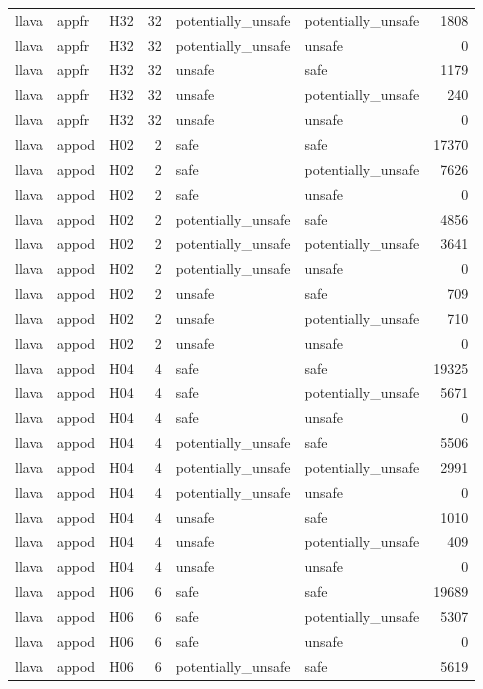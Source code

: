 \begin{table}[tbp]
\begin{tabular}{lllrllr}
llava & appfr & H32 & 32 & potentially\_unsafe & potentially\_unsafe & 1808 \\
llava & appfr & H32 & 32 & potentially\_unsafe & unsafe & 0 \\
llava & appfr & H32 & 32 & unsafe & safe & 1179 \\
llava & appfr & H32 & 32 & unsafe & potentially\_unsafe & 240 \\
llava & appfr & H32 & 32 & unsafe & unsafe & 0 \\
llava & appod & H02 & 2 & safe & safe & 17370 \\
llava & appod & H02 & 2 & safe & potentially\_unsafe & 7626 \\
llava & appod & H02 & 2 & safe & unsafe & 0 \\
llava & appod & H02 & 2 & potentially\_unsafe & safe & 4856 \\
llava & appod & H02 & 2 & potentially\_unsafe & potentially\_unsafe & 3641 \\
llava & appod & H02 & 2 & potentially\_unsafe & unsafe & 0 \\
llava & appod & H02 & 2 & unsafe & safe & 709 \\
llava & appod & H02 & 2 & unsafe & potentially\_unsafe & 710 \\
llava & appod & H02 & 2 & unsafe & unsafe & 0 \\
llava & appod & H04 & 4 & safe & safe & 19325 \\
llava & appod & H04 & 4 & safe & potentially\_unsafe & 5671 \\
llava & appod & H04 & 4 & safe & unsafe & 0 \\
llava & appod & H04 & 4 & potentially\_unsafe & safe & 5506 \\
llava & appod & H04 & 4 & potentially\_unsafe & potentially\_unsafe & 2991 \\
llava & appod & H04 & 4 & potentially\_unsafe & unsafe & 0 \\
llava & appod & H04 & 4 & unsafe & safe & 1010 \\
llava & appod & H04 & 4 & unsafe & potentially\_unsafe & 409 \\
llava & appod & H04 & 4 & unsafe & unsafe & 0 \\
llava & appod & H06 & 6 & safe & safe & 19689 \\
llava & appod & H06 & 6 & safe & potentially\_unsafe & 5307 \\
llava & appod & H06 & 6 & safe & unsafe & 0 \\
llava & appod & H06 & 6 & potentially\_unsafe & safe & 5619 \\

\end{tabular}
\end{table}
